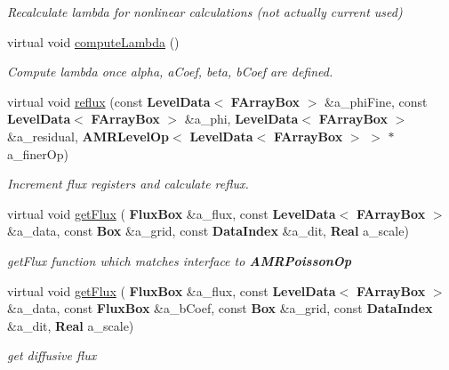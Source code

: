 \begin{Indent}
\begin{DoxyCompactItemize}
\begin{DoxyCompactList}\small\item\em Recalculate lambda for nonlinear calculations (not actually current used) \end{DoxyCompactList}\item 
\mbox{\label{class_a_m_r_non_linear_multi_comp_op_a4fe4520a51b78a009eba0cde433949dd}} 
virtual void \hyperlink{class_a_m_r_non_linear_multi_comp_op_a4fe4520a51b78a009eba0cde433949dd}{compute\+Lambda} ()
\begin{DoxyCompactList}\small\item\em Compute lambda once alpha, a\+Coef, beta, b\+Coef are defined. \end{DoxyCompactList}\item 
\mbox{\label{class_a_m_r_non_linear_multi_comp_op_a2fb72537fbed147bb56f3eea440746ea}} 
virtual void \hyperlink{class_a_m_r_non_linear_multi_comp_op_a2fb72537fbed147bb56f3eea440746ea}{reflux} (const \textbf{ Level\+Data}$<$ \textbf{ F\+Array\+Box} $>$ \&a\+\_\+phi\+Fine, const \textbf{ Level\+Data}$<$ \textbf{ F\+Array\+Box} $>$ \&a\+\_\+phi, \textbf{ Level\+Data}$<$ \textbf{ F\+Array\+Box} $>$ \&a\+\_\+residual, \textbf{ A\+M\+R\+Level\+Op}$<$ \textbf{ Level\+Data}$<$ \textbf{ F\+Array\+Box} $>$ $>$ $\ast$a\+\_\+finer\+Op)
\begin{DoxyCompactList}\small\item\em Increment flux registers and calculate reflux. \end{DoxyCompactList}\item 
virtual void \hyperlink{class_a_m_r_non_linear_multi_comp_op_a348203bd1783a1ce09fb8dbf876d79ae}{get\+Flux} (\textbf{ Flux\+Box} \&a\+\_\+flux, const \textbf{ Level\+Data}$<$ \textbf{ F\+Array\+Box} $>$ \&a\+\_\+data, const \textbf{ Box} \&a\+\_\+grid, const \textbf{ Data\+Index} \&a\+\_\+dit, \textbf{ Real} a\+\_\+scale)
\begin{DoxyCompactList}\small\item\em get\+Flux function which matches interface to \textbf{ A\+M\+R\+Poisson\+Op} \end{DoxyCompactList}\item 
\mbox{\label{class_a_m_r_non_linear_multi_comp_op_ab3b9ca0576f197409ff893e598a286d0}} 
virtual void \hyperlink{class_a_m_r_non_linear_multi_comp_op_ab3b9ca0576f197409ff893e598a286d0}{get\+Flux} (\textbf{ Flux\+Box} \&a\+\_\+flux, const \textbf{ Level\+Data}$<$ \textbf{ F\+Array\+Box} $>$ \&a\+\_\+data, const \textbf{ Flux\+Box} \&a\+\_\+b\+Coef, const \textbf{ Box} \&a\+\_\+grid, const \textbf{ Data\+Index} \&a\+\_\+dit, \textbf{ Real} a\+\_\+scale)
\begin{DoxyCompactList}\small\item\em get diffusive flux \end{DoxyCompactList}\end{DoxyCompactItemize}
\end{Indent}
